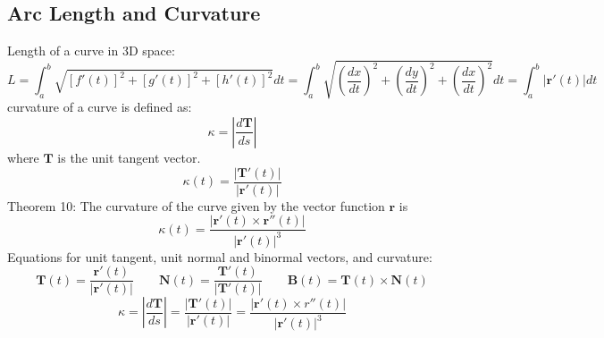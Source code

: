 \documentclass{article}
\begin{document}
    \subsection{Arc Length and Curvature}
    \begin{outline}
        \1 Length of a curve in 3D space: \[L=\int^b_a\sqrt{[f'(t)]^2+[g'(t)]^2+[h'(t)]^2}dt=\int^b_a\sqrt{\left(\dfrac{dx}{dt}\right)^2+\left(\dfrac{dy}{dt}\right)^2+\left(\dfrac{dx}{dt}\right)^2}dt=\int^b_a|\mathbf r'(t)|dt\]
        \1 curvature of a curve is defined as: \[\kappa=\left|\dfrac{d\mathbf T}{ds}\right|\] where $\mathbf T$ is the unit tangent vector. 
        \1 \[\kappa(t)=\dfrac{|\mathbf T'(t)|}{|\mathbf r'(t)|}\]
        \1 Theorem 10: The curvature of the curve given by the vector function $\mathbf r$ is \[\kappa(t)=\dfrac{|\mathbf r'(t)\times\mathbf r''(t)|}{|\mathbf r'(t)|^3}\]
        \1 Equations for unit tangent, unit normal and binormal vectors, and curvature: \[\mathbf T(t)=\dfrac{\mathbf r'(t)}{|\mathbf r'(t)|}\qquad \mathbf N(t)=\dfrac{\mathbf T'(t)}{|\mathbf T'(t)|}\qquad \mathbf B(t)=\mathbf T(t)\times\mathbf N(t)\]\[\kappa=\left|\dfrac{d\mathbf T}{ds}\right|=\dfrac{|\mathbf T'(t)|}{|\mathbf r'(t)|}=\dfrac{|\mathbf r'(t)\times r''(t)|}{|\mathbf r'(t)|^3}\]

    \end{outline}
\end{document}
